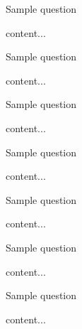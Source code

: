 \documentclass[11pt]{article} %
\begin{document}
	\renewcommand*{\CourseCodeAN}{CLASS 000 - Assignment\#0} %
	\renewcommand*{\AssignmentDate}{00 MONTH 2018} %
	
	\pagestyle{Assignment}
	\fancyhfoffset[E,O]{0pt} %
	
	\begin{qstn}[1][][10] %
		Sample question
	\begin{soln}
		content...
	\end{soln}
	\end{qstn}
	
	\begin{qstn}[2][][10]
		Sample question
	\begin{soln}
		content...
	\end{soln}
	\end{qstn}
	
	\begin{qstn}[3][][10]
		Sample question
	\begin{soln}
		content...
	\end{soln}
	\end{qstn}
	
	\begin{qstn}[4][][10]
		Sample question
	\begin{soln}
		content...
	\end{soln}
	\end{qstn}
	
	\begin{qstn}[5][][10]
		Sample question
	\begin{soln}
		content...
	\end{soln}
	\end{qstn}
	
	\begin{qstn}[6][][10]
		Sample question
	\begin{soln}
		content...
	\end{soln}
	\end{qstn}
	
	\begin{qstn}[7][][10]
		Sample question
	\begin{soln}
		content...
	\end{soln}
	\end{qstn}
	
\end{document}
